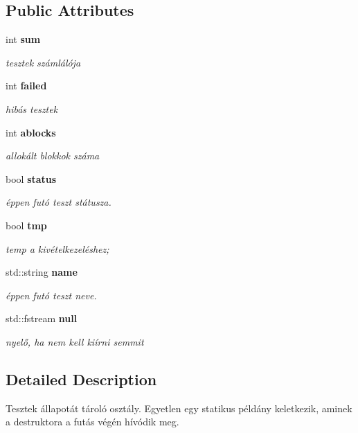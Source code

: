 \subsection*{Public Attributes}
\begin{DoxyCompactItemize}
\item 
int \textbf{ sum}
\begin{DoxyCompactList}\small\item\em tesztek számlálója \end{DoxyCompactList}\item 
int \textbf{ failed}
\begin{DoxyCompactList}\small\item\em hibás tesztek \end{DoxyCompactList}\item 
int \textbf{ ablocks}
\begin{DoxyCompactList}\small\item\em allokált blokkok száma \end{DoxyCompactList}\item 
bool \textbf{ status}
\begin{DoxyCompactList}\small\item\em éppen futó teszt státusza. \end{DoxyCompactList}\item 
bool \textbf{ tmp}
\begin{DoxyCompactList}\small\item\em temp a kivételkezeléshez; \end{DoxyCompactList}\item 
std\+::string \textbf{ name}
\begin{DoxyCompactList}\small\item\em éppen futó teszt neve. \end{DoxyCompactList}\item 
std\+::fstream \textbf{ null}
\begin{DoxyCompactList}\small\item\em nyelő, ha nem kell kiírni semmit \end{DoxyCompactList}\end{DoxyCompactItemize}


\subsection{Detailed Description}
Tesztek állapotát tároló osztály. Egyetlen egy statikus példány keletkezik, aminek a destruktora a futás végén hívódik meg. 


